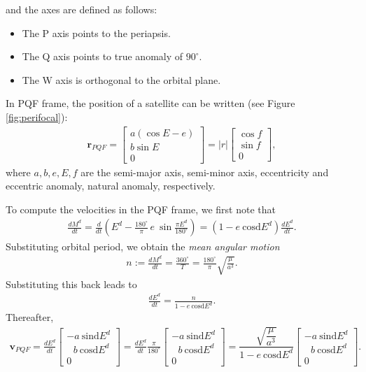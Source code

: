 \documentclass [12pt, a4paper] {article}
\newcommand{\sind}
{
	\textrm{sind}
}
\newcommand{\cosd}
{
	\textrm{cosd}
}
\newcommand{\vc}[1]
{
	\boldsymbol{#1}
}
\newcommand{\diff}[2]
{
	\frac{d #1}{d #2}
}
\begin{document}
and the axes are defined as follows:
\begin {itemize}
  \item The P axis points to the periapsis.
  \item The Q axis points to true anomaly of $90^\circ$.
  \item The W axis is orthogonal to the orbital plane.
\end {itemize}
In PQF frame, the position of a satellite can be written (see Figure \ref{fig:perifocal}):
\begin {eqnarray}
  \label{eq:PQF}
  \vc r_{PQF} 
  = 
  \begin {bmatrix}
    a\left(\cos E - e\right) \\ 
    b\sin E \\ 
    0
  \end {bmatrix}
  =
  |r|
  \begin {bmatrix}
    \cos f \\ 
    \sin f \\ 
    0
  \end {bmatrix}
  ,
\end {eqnarray}
where $a, b, e, E, f$ are the semi-major axis, semi-minor axis, eccentricity and 
eccentric anomaly, natural anomaly, respectively. 

To compute the velocities in the PQF frame, we first note that 
\begin {eqnarray}
  \diff{M^d}{t}
  =
  \diff{}{t}\left(
  E^d - \frac{180^\circ}{\pi}\,e\:\sin\frac{\pi E^d}{180^\circ}
  \right)
  = 
  \left(1 - e\:\cosd E^d\right)\diff{E^d}{t}.
\end {eqnarray}
Substituting orbital period, we obtain the \emph{mean angular motion}
\begin {eqnarray}
  n := \diff{M^d}{t} = \frac{360^\circ}{T} = \frac{180^\circ}{\pi}\sqrt{\frac{\mu}{a^3}}.
\end {eqnarray}
Substituting this back leads to 
\begin {eqnarray}
  \diff{E^d}{t} = \frac{n}{1 - e\:\cosd E^d}.
\end {eqnarray}
Thereafter, 
\begin {eqnarray}
  \vc v_{PQF} 
  =
  \diff{E^d}{t}
  \begin {bmatrix}
    -a\:\sind E^d \\
     \:\:\:b\:\cosd E^d \\
     0
  \end {bmatrix}
  =
  \diff{E^d}{t}
  \frac{\pi}{180^\circ}
  \begin {bmatrix}
    -a\:\sind E^d \\
     \:\:\:b\:\cosd E^d \\
     0
  \end {bmatrix}
  =
  \dfrac{\sqrt{\dfrac{\mu}{a^3}}}{1 - e\:\cosd E^d}
  \begin {bmatrix}
    -a\:\sind E^d \\
     \:\:\:b\:\cosd E^d \\
     0
  \end {bmatrix}.
\end {eqnarray}
\end{document}
